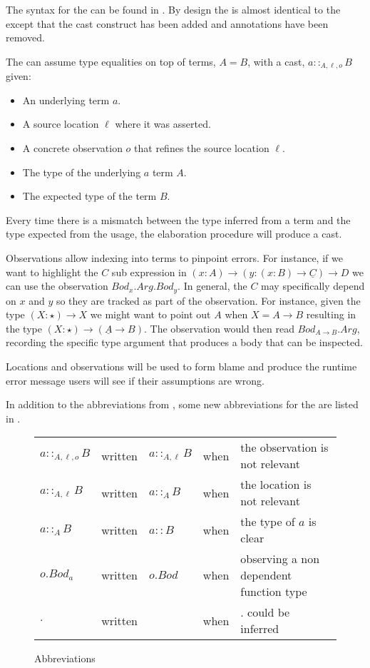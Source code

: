 The syntax for the \clang{} can be found in .
By design the \clang{} is almost identical to the \slang{} except that the cast construct has been added and annotations have been removed.

The \clang{} can assume type equalities on top of terms, $A=B$, with a cast, $a::_{A,\ensuremath{\ell},o}B$ given:
\begin{itemize}
\item An underlying term $a$.
\item A source location $\ell$ where it was asserted.
\item A concrete observation $o$ that refines the source location $\ell$.
\item The type of the underlying $a$ term $A$.
\item The expected type of the term $B$.
\end{itemize}
Every time there is a mismatch between the type inferred from a term and the type expected from the usage, the elaboration procedure will produce a cast.
 
Observations allow indexing into terms to pinpoint errors.
For instance, if we want to highlight the $C$ sub expression in $\left(x:A\right)\rightarrow\left(y:\left(x:B\right)\rightarrow\underline{C}\right)\rightarrow D$ we can use the observation $Bod_{x}.Arg.Bod_{y}$.
In general, the $C$ may specifically depend on $x$ and $y$ so they are tracked as part of the observation.
For instance, given the type $\left(X:\star\right)\rightarrow X$ we might want to point out $A$ when $X=A\rightarrow B$ resulting in the type $\left(X:\star\right)\rightarrow\left(\underline{A}\rightarrow B\right)$.
The observation would then read $Bod_{A\rightarrow B}.Arg$, recording the specific type argument that produces a body that can be inspected.
 
Locations and observations will be used to form blame and produce the runtime error message users will see if their assumptions are wrong.
 
In addition to the abbreviations from , some new abbreviations for the \clang{} are listed in .

\begin{figure}
\begin{tabular}{lclll}
$a::_{A,\ensuremath{\ell},o}B$ & written & $a::_{A,\ensuremath{\ell}}B$ & when & the observation is not relevant\tabularnewline
$a::_{A,\ensuremath{\ell}}B$ & written & $a::_{A}B$ & when & the location is not relevant\tabularnewline
$a::_{A}B$ & written & $a::B$ & when & the type of $a$ is clear\tabularnewline
$o.Bod_a$ & written & $o.Bod$ & when & observing a non dependent function type\tabularnewline
$.$ & written &  & when & $.$ could be inferred \tabularnewline
\end{tabular}

\caption{\CLang{} Abbreviations}
\label{fig:cast-pre-syntax-abrev}
\end{figure}

